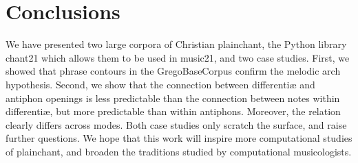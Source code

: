 \documentclass[sigconf,screen]{acmart}
\begin{document}
\section{Conclusions}


We have presented two large corpora of Christian plainchant, the Python library chant21 which allows them to be used in music21, and two case studies.
First, we showed that phrase contours in the GregoBaseCorpus confirm the melodic arch hypothesis.
Second, we show that the connection between differentiæ and antiphon openings is less predictable than the connection between notes within differentiæ, but more predictable than  within antiphons.
Moreover, the relation clearly differs across modes.
Both case studies only scratch the surface, and raise further questions.
We hope that this work will inspire more computational studies of plainchant, and broaden the traditions studied by computational musicologists.

\pagebreak



\end{document}
